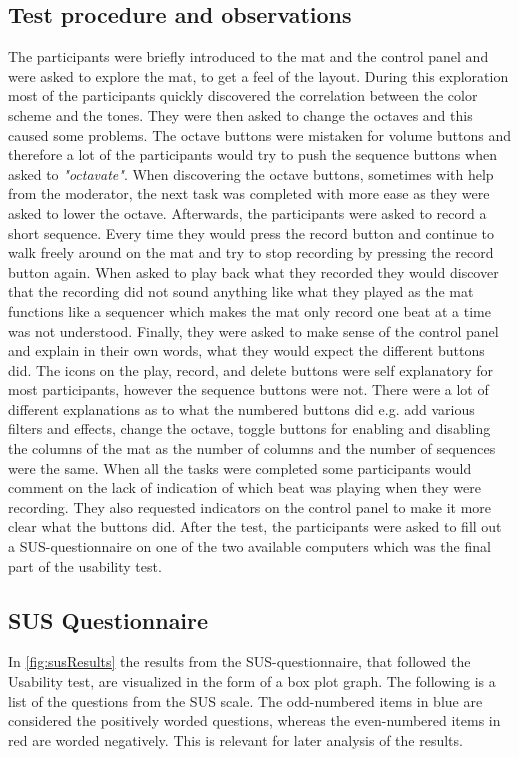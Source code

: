 \subsection{Test procedure and observations}
The participants were briefly introduced to the mat and the control panel and were asked to explore the mat, to get a feel of the layout. During this exploration most of the participants quickly discovered the correlation between the color scheme and the tones. They were then asked to change the octaves and this caused some problems. The octave buttons were mistaken for volume buttons and therefore a lot of the participants would try to push the sequence buttons when asked to \textit{"octavate"}. When discovering the octave buttons, sometimes with help from the moderator, the next task was completed with more ease as they were asked to lower the octave. Afterwards, the participants were asked to record a short sequence. Every time they would press the record button and continue to walk freely around on the mat and try to stop recording by pressing the record button again. When asked to play back what they recorded they would discover that the recording did not sound anything like what they played as the mat functions like a sequencer which makes the mat only record one beat at a time was not understood. Finally, they were asked to make sense of the control panel and explain in their own words, what they would expect the different buttons did. The icons on the play, record, and delete buttons were self explanatory for most participants, however the sequence buttons were not. There were a lot of different explanations as to what the numbered buttons did e.g. add various filters and effects, change the octave, toggle buttons for enabling and disabling the columns of the mat as the number of columns and the number of sequences were the same. When all the tasks were completed some participants would comment on the lack of indication of which beat was playing when they were recording. They also requested indicators on the control panel to make it more clear what the buttons did. After the test, the participants were asked to fill out a SUS-questionnaire on one of the two available computers which was the final part of the usability test.

\subsection{SUS Questionnaire}
In \autoref{fig:susResults} the results from the SUS-questionnaire, that followed the Usability test, are visualized in the form of a box plot graph. The following is a list of the questions from the SUS scale. The odd-numbered items in blue are considered the positively worded questions, whereas the even-numbered items in red are worded negatively. This is relevant for later analysis of the results.\\


